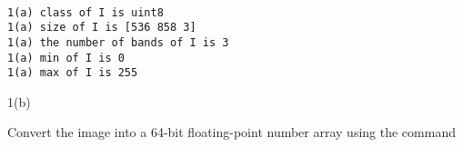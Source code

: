 \documentclass[11pt]{article}
\begin{document}
    \begin{center}
    \end{center}
    { \hspace*{\fill} \\}
    
    \begin{Verbatim}[commandchars=\\\{\}]
1(a) class of I is uint8
1(a) size of I is [536 858 3]
1(a) the number of bands of I is 3
1(a) min of I is 0
1(a) max of I is 255

    \end{Verbatim}

    1(b)

Convert the image into a 64-bit floating-point number array using the
command
\end{document}

